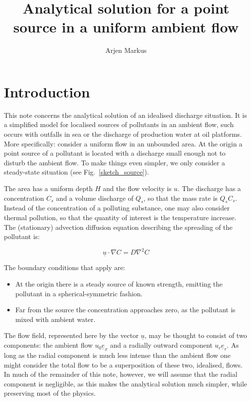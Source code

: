 \documentclass[onecolumn]{article}
\begin{document}
\title{Analytical solution for a point source in a uniform ambient flow}

\author{Arjen Markus}

\maketitle

\section*{Introduction}
This note concerns the analytical solution of an idealised discharge situation. It is a
simplified model for localised sources of pollutants in an ambient flow, such occurs with
outfalls in sea or the discharge of production water at oil platforms. More specifically:
consider a uniform flow in an unbounded area. At the origin a point source of a pollutant is
located with a discharge small enough not to disturb the ambient flow.
To make things even simpler, we only consider a steady-state situation (see Fig.\ \ref{sketch_source}).

The area has a uniform depth \(H\) and the flow velocity is \(u\). The discharge has a concentration
\(C_s\) and a volume discharge of \(Q_s\), so that the mass rate is \(Q_s C_s\). Instead of the
concentration of a polluting substance, one may also consider thermal pollution, so that the
quantity of interest is the temperature increase. The (stationary) advection diffusion equation
describing the spreading of the pollutant is:

\begin{equation}
\label{AdvDiff}
\underline{u} \cdot \nabla C = D \nabla^2 C
\end{equation}

The boundary conditions that apply are:
\begin{itemize}
\item
At the origin there is a steady source of known strength, emitting the pollutant in a spherical-symmetric
fashion.
\item
Far from the source the concentration approaches zero, as the pollutant is mixed with ambient water.
\end{itemize}

The flow field, represented here by the vector \(\underline{u}\), may be thought to consist of two
components: the ambient flow \(u_0 \underline{e}_x\) and a radially outward component \(u_r \underline{e}_r\).
As long as the radial component is much less intense than the ambient flow one might consider the
total flow to be a superposition of these two, idealised, flows. In much of the remainder of this note,
however, we will assume that the radial component is negligible, as this makes the analytical solution
much simpler, while preserving most of the physics.
\end{document}
